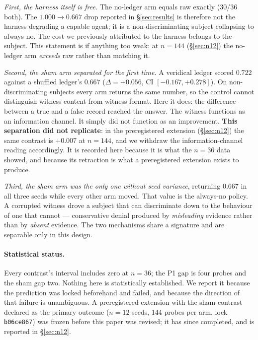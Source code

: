 \documentclass[11pt]{article}
\begin{document}
\emph{First, the harness itself is free.} The no-ledger arm equals raw
exactly (30/36 both). The $1.000 \to 0.667$ drop reported in
\S\ref{sec:results} is therefore not the harness degrading a capable
agent; it is a non-discriminating subject collapsing to always-no. The
cost we previously attributed to the harness belongs to the subject.
This statement is if anything too weak: at $n=144$ (\S\ref{sec:n12}) the
no-ledger arm \emph{exceeds} raw rather than matching it.

\emph{Second, the sham arm separated for the first time.} A veridical
ledger scored $0.722$ against a shuffled ledger's $0.667$
($\Delta = +0.056$, CI $[-0.167, +0.278]$). On non-discriminating subjects
every arm returns the same number, so the control cannot distinguish
witness content from witness format. Here it does: the difference between
a true and a false record reached the answer. The witness functions as an
information channel. It simply did not function as an improvement.
\textbf{This separation did not replicate}: in the preregistered extension
(\S\ref{sec:n12}) the same contrast is $+0.007$ at $n=144$, and we withdraw
the information-channel reading accordingly. It is recorded here because it
is what the $n=36$ data showed, and because its retraction is what a
preregistered extension exists to produce.

\emph{Third, the sham arm was the only one without seed variance},
returning $0.667$ in all three seeds while every other arm moved. That
value is the always-no policy. A corrupted witness drove a subject that
can discriminate down to the behaviour of one that cannot --- conservative
denial produced by \emph{misleading} evidence rather than by \emph{absent}
evidence. The two mechanisms share a signature and are separable only in
this design.

\paragraph{Statistical status.} Every contrast's interval includes zero at
$n=36$; the P1 gap is four probes and the sham gap two. Nothing here is
statistically established. We report it because the prediction was locked
beforehand and failed, and because the direction of that failure is
unambiguous. A preregistered extension with the sham contrast declared as
the primary outcome ($n=12$ seeds, 144 probes per arm, lock
\texttt{b06ce867}) was frozen before this paper was revised; it has since
completed, and is reported in \S\ref{sec:n12}.
\end{document}
